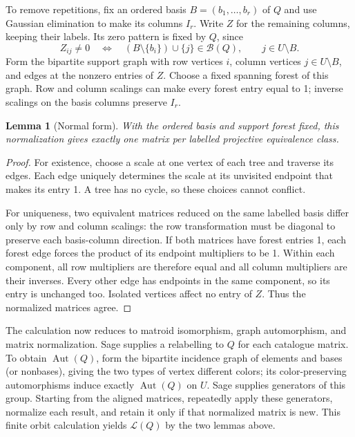 \documentclass[11pt,a4paper]{article}
\newtheorem{lemma}[theorem]{Lemma}
\theoremstyle{definition}
\newcommand{\B}{\mathcal B}
\newcommand{\Aut}{\operatorname{Aut}}
\begin{document}
To remove repetitions, fix an ordered basis $B=(b_1,\ldots,b_r)$
of $Q$ and use Gaussian elimination to make its columns $I_r$.
Write $Z$ for the remaining columns, keeping their labels. Its
zero pattern is fixed by $Q$, since
\[
 Z_{ij}\ne0\quad\Longleftrightarrow\quad
       (B\setminus\{b_i\})\cup\{j\}\in\B(Q),\qquad j\in U\setminus B.
\]
Form the bipartite support graph with row vertices $i$, column
vertices $j\in U\setminus B$, and edges at the nonzero entries of
$Z$. Choose a fixed spanning forest of this graph. Row and column
scalings can make every forest entry equal to 1; inverse scalings
on the basis columns preserve $I_r$.

\begin{lemma}[Normal form]\label{lem:normalform}
With the ordered basis and support forest fixed, this normalization
gives exactly one matrix per labelled projective equivalence class.
\end{lemma}
\begin{proof}
For existence, choose a scale at one vertex of each tree and
traverse its edges. Each edge uniquely determines the scale at
its unvisited endpoint that makes its entry 1. A tree has no cycle,
so these choices cannot conflict.

For uniqueness, two equivalent matrices reduced on the same labelled
basis differ only by row and column scalings: the row transformation
must be diagonal to preserve each basis-column direction. If both
matrices have forest entries 1, each forest edge forces the product
of its endpoint multipliers to be 1. Within each component, all row
multipliers are therefore equal and all column multipliers are
their inverses. Every other edge has endpoints in the same
component, so its entry is unchanged too. Isolated vertices affect
no entry of $Z$. Thus the normalized matrices agree.
\end{proof}

The calculation now reduces to matroid isomorphism, graph
automorphism, and matrix normalization. Sage supplies a relabelling
to $Q$ for each catalogue matrix. To obtain $\Aut(Q)$, form the
bipartite incidence graph of elements and bases (or nonbases),
giving the two types of vertex different colors; its
color-preserving automorphisms induce exactly $\Aut(Q)$ on $U$.
Sage supplies generators of this group. Starting from the aligned
matrices, repeatedly apply these generators, normalize each result,
and retain it only if that normalized matrix is new. This finite
orbit calculation yields $\mathcal L(Q)$ by the two lemmas above.
\end{document}
